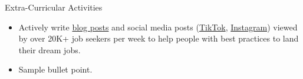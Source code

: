 \documentclass{resume} %
\begin{document}
\begin{rSection}{Extra-Curricular Activities}
\begin{itemize}
    \item 	Actively write \href{https://www.faangpath.com/blog/}{blog posts} and social media posts (\href{https://www.tiktok.com/@faangpath}{TikTok}, \href{https://www.instagram.com/faangpath/?hl=en}{Instagram}) viewed by over 20K+ job seekers per week to help people with best practices to land their dream jobs.
    \item	Sample bullet point.
\end{itemize}


\end{rSection}

\end{document}
